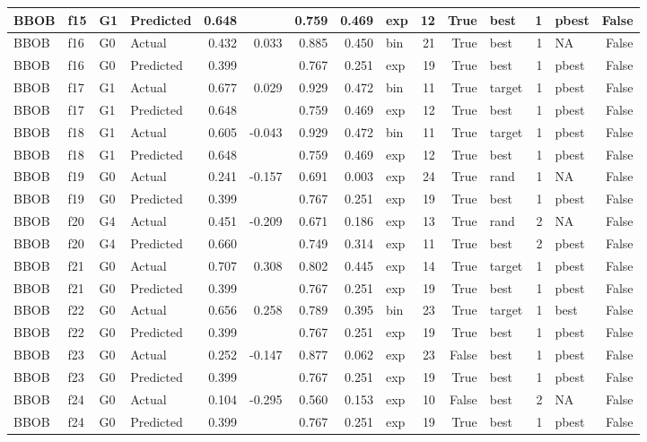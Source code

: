 \begin{table}[htbp]
{\begin{tabular}{llllrrrrlrrlrlr}
BBOB & f15 & G1 & Predicted & 0.648 &  & 0.759 & 0.469 & exp & 12 & True & best & 1 & pbest & False \\
\midrule
BBOB & f16 & G0 & Actual & 0.432 & 0.033 & 0.885 & 0.450 & bin & 21 & True & best & 1 & NA & False \\
BBOB & f16 & G0 & Predicted & 0.399 &  & 0.767 & 0.251 & exp & 19 & True & best & 1 & pbest & False \\
\midrule
BBOB & f17 & G1 & Actual & 0.677 & 0.029 & 0.929 & 0.472 & bin & 11 & True & target & 1 & pbest & False \\
BBOB & f17 & G1 & Predicted & 0.648 &  & 0.759 & 0.469 & exp & 12 & True & best & 1 & pbest & False \\
\midrule
BBOB & f18 & G1 & Actual & 0.605 & -0.043 & 0.929 & 0.472 & bin & 11 & True & target & 1 & pbest & False \\
BBOB & f18 & G1 & Predicted & 0.648 &  & 0.759 & 0.469 & exp & 12 & True & best & 1 & pbest & False \\
\midrule
BBOB & f19 & G0 & Actual & 0.241 & -0.157 & 0.691 & 0.003 & exp & 24 & True & rand & 1 & NA & False \\
BBOB & f19 & G0 & Predicted & 0.399 &  & 0.767 & 0.251 & exp & 19 & True & best & 1 & pbest & False \\
\midrule
BBOB & f20 & G4 & Actual & 0.451 & -0.209 & 0.671 & 0.186 & exp & 13 & True & rand & 2 & NA & False \\
BBOB & f20 & G4 & Predicted & 0.660 &  & 0.749 & 0.314 & exp & 11 & True & best & 2 & pbest & False \\
\midrule
BBOB & f21 & G0 & Actual & 0.707 & 0.308 & 0.802 & 0.445 & exp & 14 & True & target & 1 & pbest & False \\
BBOB & f21 & G0 & Predicted & 0.399 &  & 0.767 & 0.251 & exp & 19 & True & best & 1 & pbest & False \\
\midrule
BBOB & f22 & G0 & Actual & 0.656 & 0.258 & 0.789 & 0.395 & bin & 23 & True & target & 1 & best & False \\
BBOB & f22 & G0 & Predicted & 0.399 &  & 0.767 & 0.251 & exp & 19 & True & best & 1 & pbest & False \\
\midrule
BBOB & f23 & G0 & Actual & 0.252 & -0.147 & 0.877 & 0.062 & exp & 23 & False & best & 1 & pbest & False \\
BBOB & f23 & G0 & Predicted & 0.399 &  & 0.767 & 0.251 & exp & 19 & True & best & 1 & pbest & False \\
\midrule
BBOB & f24 & G0 & Actual & 0.104 & -0.295 & 0.560 & 0.153 & exp & 10 & False & best & 2 & NA & False \\
BBOB & f24 & G0 & Predicted & 0.399 &  & 0.767 & 0.251 & exp & 19 & True & best & 1 & pbest & False \\
\bottomrule
\end{tabular}%
}
\end{table}